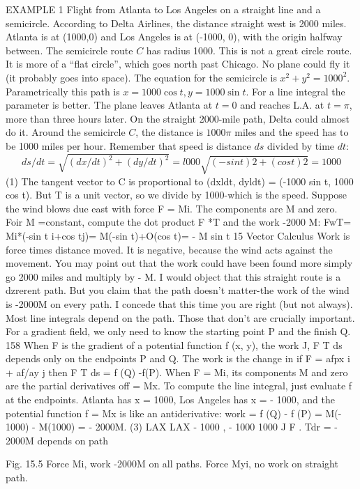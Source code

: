 EXAMPLE 1 Flight from Atlanta to Los Angeles on a straight line and a semicircle.
According to Delta Airlines, the distance straight west is 2000 miles. Atlanta is at
(1000,0) and Los Angeles is at (-1000, 0), with the origin halfway between. The
semicircle route $C$ has radius 1000. This is not a great circle route. It is more of a
``flat circle'', which goes north past Chicago. No plane could fly it (it probably goes
into space).
The equation for the semicircle is $x^2 + y^2 = 1000^2$. Parametrically this path is $x =
1000 \cos t, y = 1000 \sin t$. For a line integral the parameter is better. The plane leaves
Atlanta at $t = 0$ and reaches L.A. at $t = \pi$, more than three hours later. On the straight
2000-mile path, Delta could almost do it. Around the semicircle $C$, the distance is
$1000\pi$ miles and the speed has to be 1000 miles per hour. Remember that speed is
distance $ds$ divided by time $dt$:
$$ds/dt = \sqrt{(dx/dt)^2 + (dy/dt)^2} = l000\sqrt{(- sin t)2 + (cos t)2} = 1000$$ (1)
The tangent vector to C is proportional to (dxldt, dyldt) = (-1000 sin t, 1000 cos t).
But T is a unit vector, so we divide by 1000-which is the speed.
Suppose the wind blows due east with force F = Mi. The components are M and
zero. Foir M =constant, compute the dot product F *T and the work -2000 M:
FwT= Mi*(-sin t i+cos tj)= M(-sin t)+O(cos t)= - M sin t 
15 Vector Calculus
Work is force times distance moved. It is negative, because the wind acts against the
movement. You may point out that the work could have been found more simply go
2000 miles and multiply by - M. I would object that this straight route is a
dzrerent path. But you claim that the path doesn't matter-the work of the wind is
-2000M on every path. I concede that this time you are right (but not always).
Most line integrals depend on the path. Those that don't are crucially important.
For a gradient field, we only need to know the starting point P and the finish Q.
158 When F is the gradient of a potential function f (x, y), the work J, F T ds
depends only on the endpoints P and Q. The work is the change in
if F = afpx i + af/ay j then F T ds = f (Q) -f(P).
When F = Mi, its components M and zero are the partial derivatives off = Mx. To
compute the line integral, just evaluate f at the endpoints. Atlanta has x = 1000, Los
Angeles has x = - 1000, and the potential function f = Mx is like an antiderivative:
work = f (Q) - f (P) = M(- 1000) - M(1000) = - 2000M. (3)
LAX LAX - 1000 , - 1000 1000
J F . Tdr = - 2000M depends on path

Fig. 15.5 Force Mi, work -2000M on all paths. Force Myi, no work on straight path.

